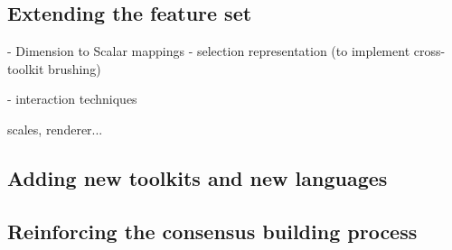 \subsection{Extending the feature set}

- Dimension to Scalar mappings
- selection representation (to implement cross-toolkit brushing)

- interaction techniques

scales, renderer...

\subsection{Adding new toolkits and new languages}



\subsection{Reinforcing the consensus building process}

